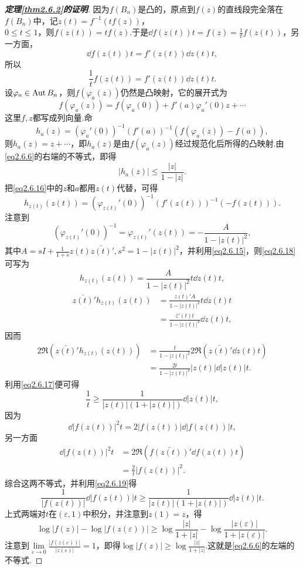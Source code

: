 \begin{proof}[\textbf{定理\ref{thm2.6.2}的证明}]
因为$f(B_n)$是凸的，原点到$f(z)$的直线段完全落在$f(B_n)$中，记$z(t)=f^{-1}(tf(z))$，\\$0\le t\le1$，则$f(z(t))=tf(z)$.于是$\dd{f(z(t))}{t}=f(z)=\frac1t f(z(t))$，另一方面，
\[\dd{f(z(t))}{t}=f'(z(t))\dd{z(t)}{t},\]
所以
\begin{equation}\label{eq2.6.15}
	\frac1t f(z(t))=f'(z(t))\dd{z(t)}{t}.
\end{equation}
设$\varphi_a\in\operatorname{Aut} B_n$，则$f(\varphi_a(z))$仍然是凸映射，它的展开式为
\[f(\varphi_a(z))=f(\varphi_a(0))+f'(a)\varphi_a'(0)z+\cdots\]
这里$f,z$都写成列向量.命
\begin{equation}\label{eq2.6.16}
	h_a(z)=(\varphi_a'(0))^{-1}(f'(a))^{-1}(f(\varphi_a(z))-f(a)),
\end{equation}
则$h_a(z)=z+\cdots$，即$h_a(z)$是由$f(\varphi_a(z))$经过规范化后所得的凸映射.由\eqref{eq2.6.6}的右端的不等式，即得
\begin{equation}\label{eq2.6.17}
	|h_a(z)|\le\frac{|z|}{1-|z|}.
\end{equation}
把\eqref{eq2.6.16}中的$z$和$a$都用$z(t)$代替，可得
\begin{equation}\label{eq2.6.18}
	h_{z(t)}(z(t))=(\varphi_{z(t)}'(0))^{-1}(f'(z(t)))^{-1}(-f(z(t))).
\end{equation}
注意到
\[(\varphi_{z(t)}'(0))^{-1}=\varphi_{z(t)}'(z(t))=-\frac{A}{1-|z(t)|^2},\]
其中$A=sI+\frac1{1+s}z(t)\bar{z(t)}',s^2=1-|z(t)|^2$，并利用\eqref{eq2.6.15}，则\eqref{eq2.6.18}可写为
\[h_{z(t)}(z(t))=\frac{A}{1-|z(t)|^2}t\dd{z(t)}{t},\]
\begin{align*}
	\bar{z(t)}' h_{z(t)}(z(t))
	&=\frac{\bar{z(t)}' A}{1-|z(t)|^2}t\dd{z(t)}{t}\\
	&=\frac{\bar{z}'(t) t}{1-|z(t)|^2}\dd{z(t)}{t},
\end{align*}
因而
\begin{align*}
	2\Re(\bar{z(t)}'h_{z(t)}(z(t)))
	&=\frac{t}{1-|z(t)|^2}2\Re\left(\bar{z(t)}' \dd{z(t)}{t}\right)\\
	&=\frac{2t}{1-|z(t)|^2}|z(t)|\dd{|z(t)|}{t}.
\end{align*}
利用\eqref{eq2.6.17}便可得
\begin{equation}\label{eq2.6.19}
	\frac1t\ge\frac1{|z(t)|(1+|z(t)|)}\dd{|z(t)|}{t},
\end{equation}
因为
\[\dd{|f(z(t))|^2}{t}=2|f(z(t))|\dd{|f(z(t))|}{t},\]
另一方面
\begin{align*}
	\dd{|f(z(t))|^2}{t}
	&=2\Re\left(\bar{f(z(t))}' \dd{f(z(t))}{t}\right)\\
	&=\frac2t |f(z(t))|^2.
\end{align*}
综合这两不等式，并利用\eqref{eq2.6.19}得
\[\frac1{|f(z(t))|}\dd{|f(z(t))|}{t}\ge\frac1{|z(t)|(1+|z(t)|)}\dd{|z(t)|}{t}.\]
上式两端对$t$在$(\varepsilon,1)$中积分，并注意到$z(1)=z$，得
\[\log|f(z)|-\log|f(z(\varepsilon))|\ge\log\frac{|z|}{1+|z|}-\log\frac{|z(\varepsilon)|}{1+|z(\varepsilon)|}.\]
注意到$\lim\limits_{\varepsilon\to0}\frac{|f(z(\varepsilon))|}{|z(\varepsilon)|}=1$，即得$\log|f(z)|\ge\log\frac{|z|}{1+|z|}$.这就是\eqref{eq2.6.6}的左端的不等式.
\end{proof}
